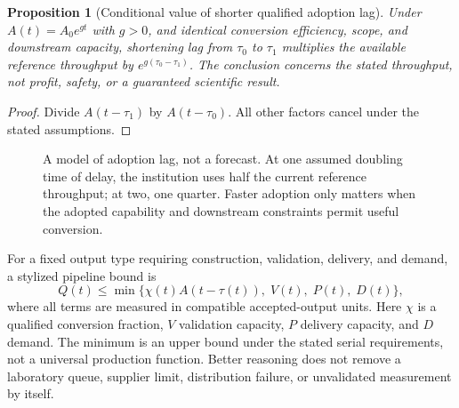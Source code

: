 \documentclass[11pt,letterpaper]{article}
\newtheorem{proposition}{Proposition}[section]
\theoremstyle{remark}\newtheorem{remark}{Remark}[section]
\begin{document}
\begin{proposition}[Conditional value of shorter qualified adoption lag]
Under $A(t)=A_0e^{gt}$ with $g>0$, and identical conversion efficiency, scope, and downstream capacity, shortening lag from $\tau_0$ to $\tau_1$ multiplies the available reference throughput by $e^{g(\tau_0-\tau_1)}$. The conclusion concerns the stated throughput, not profit, safety, or a guaranteed scientific result.
\end{proposition}
\begin{proof}
Divide $A(t-\tau_1)$ by $A(t-\tau_0)$. All other factors cancel under the stated assumptions.
\end{proof}

\begin{figure}[htbp]
\centering
{}
\caption{A model of adoption lag, not a forecast. At one assumed doubling time of delay, the institution uses half the current reference throughput; at two, one quarter. Faster adoption only matters when the adopted capability and downstream constraints permit useful conversion.}
\label{fig:lag}
\end{figure}

For a fixed output type requiring construction, validation, delivery, and demand, a stylized pipeline bound is
\begin{equation}
Q(t)\leq\min\{\chi(t)A(t-\tau(t)),\;V(t),\;P(t),\;D(t)\},
\label{eq:pipeline}
\end{equation}
where all terms are measured in compatible accepted-output units. Here $\chi$ is a qualified conversion fraction, $V$ validation capacity, $P$ delivery capacity, and $D$ demand. The minimum is an upper bound under the stated serial requirements, not a universal production function. Better reasoning does not remove a laboratory queue, supplier limit, distribution failure, or unvalidated measurement by itself.
\end{document}
